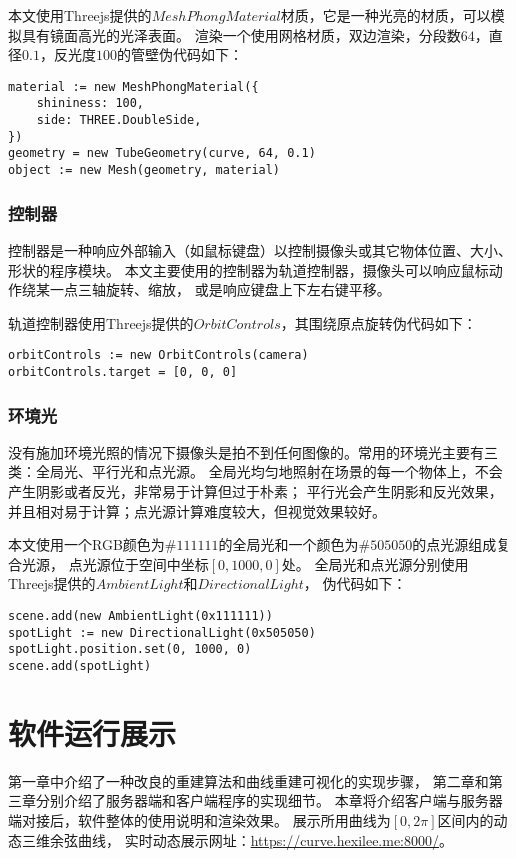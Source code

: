 本文使用Threejs提供的$MeshPhongMaterial$材质，它是一种光亮的材质，可以模拟具有镜面高光的光泽表面。
渲染一个使用网格材质，双边渲染，分段数$64$，直径$0.1$，反光度$100$的管壁伪代码如下：

\begin{lstlisting}[caption={渲染管壁}]
material := new MeshPhongMaterial({
    shininess: 100,
    side: THREE.DoubleSide,
})
geometry = new TubeGeometry(curve, 64, 0.1)
object := new Mesh(geometry, material)
\end{lstlisting}

\subsubsection{控制器}
控制器是一种响应外部输入（如鼠标键盘）以控制摄像头或其它物体位置、大小、形状的程序模块。
本文主要使用的控制器为轨道控制器，摄像头可以响应鼠标动作绕某一点三轴旋转、缩放，
或是响应键盘上下左右键平移。

轨道控制器使用Threejs提供的$OrbitControls$，其围绕原点旋转伪代码如下：

\begin{lstlisting}[caption={轨道控制器}]
orbitControls := new OrbitControls(camera)
orbitControls.target = [0, 0, 0]
\end{lstlisting}

\subsubsection{环境光}

没有施加环境光照的情况下摄像头是拍不到任何图像的。常用的环境光主要有三类：全局光、平行光和点光源。
全局光均匀地照射在场景的每一个物体上，不会产生阴影或者反光，非常易于计算但过于朴素；
平行光会产生阴影和反光效果，并且相对易于计算；点光源计算难度较大，但视觉效果较好。

本文使用一个RGB颜色为$\#111111$的全局光和一个颜色为$\#505050$的点光源组成复合光源，
点光源位于空间中坐标$[0, 1000, 0]$处。
全局光和点光源分别使用Threejs提供的$AmbientLight$和$DirectionalLight$，
伪代码如下：

\begin{lstlisting}[caption={环境光}]
scene.add(new AmbientLight(0x111111))
spotLight := new DirectionalLight(0x505050)
spotLight.position.set(0, 1000, 0)
scene.add(spotLight)
\end{lstlisting}

\cleardoublepage

\section{软件运行展示}
第一章中介绍了一种改良的重建算法和曲线重建可视化的实现步骤，
第二章和第三章分别介绍了服务器端和客户端程序的实现细节。
本章将介绍客户端与服务器端对接后，软件整体的使用说明和渲染效果。
展示所用曲线为$[0, 2\pi]$区间内的动态三维余弦曲线，
实时动态展示网址：\href{https://curve.hexilee.me:8000/}{https://curve.hexilee.me:8000/}。

